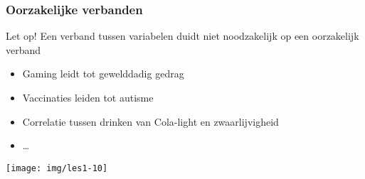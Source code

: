\documentclass[aspectratio=169]{beamer}
\begin{document}
\begin{frame}
  \frametitle{Oorzakelijke verbanden}

  \begin{alertblock}{Let op!}
  Een verband tussen variabelen duidt niet noodzakelijk op een oorzakelijk verband
  \end{alertblock}

  \begin{itemize}
    \item Gaming leidt tot gewelddadig gedrag
    \item Vaccinaties leiden tot autisme
    \item Correlatie tussen drinken van Cola-light en zwaarlijvigheid
    \item \ldots
  \end{itemize}

  \begin{center}
    \texttt{[image: img/les1-10]}
  \end{center}
\end{frame}

\end{document}
